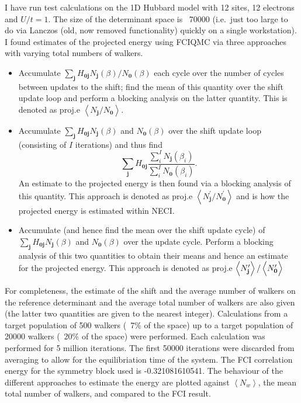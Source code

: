 \documentclass[a4paper, 12pt]{revtex4}
\newcommand{\bj}{\mathbf{j}}
\newcommand{\bz}{\mathbf{0}}
\newcommand{\av}[1]{\left\langle#1\right\rangle}
\begin{document}
I have run test calculations on the 1D Hubbard model with 12 sites, 12 electrons and $U/t=1$.  The size of the determinant space is ~70000 (i.e.\ just too large to do via Lanczos (old, now removed functionality) quickly on a single workstation).  I found estimates of the projected energy using FCIQMC via three approaches with varying total numbers of walkers.
\begin{itemize}
\item Accumulate $\sum_\bj H_{\bz\bj} N_\bj(\beta)/N_\bz(\beta)$ each cycle over the number of cycles between updates to the shift; find the mean of this quantity over the shift update loop and perform a blocking analysis on the latter quantity.  This is denoted as proj.e $\av{N_\bj/N_\bz}$.
\item Accumulate $\sum_\bj H_{\bz\bj} N_\bj(\beta)$ and $N_\bz(\beta)$ over the shift update loop (consisting of $I$ iterations) and thus find
    \begin{equation}
    \sum_\bj H_{\bz\bj} \frac{\sum_i^I N_\bj(\beta_i)}{\sum_i^I N_\bz(\beta_i)}.
    \end{equation}
An estimate to the projected energy is then found via a blocking analysis of this quantity.  This approach is denoted as proj.e $\av{N_\bj^\prime/N_\bz^\prime}$ and is how the projected energy is estimated within NECI.
\item Accumulate (and hence find the mean over the shift update cycle) of  $\sum_\bj H_{\bz\bj} N_\bj(\beta)$ and $N_\bz(\beta)$ over the update cycle.  Perform a blocking analysis of this two quantities to obtain their means and hence an estimate for the projected energy.  This approach is denoted as proj.e $\av{N_\bj^\prime}/\av{N_\bz^\prime\vphantom{N_\bj^\prime}}$
\end{itemize}
For completeness, the estimate of the shift and the average number of walkers on the reference determinant and the average total number of walkers are also given (the latter two quantities are given to the nearest integer).  Calculations from a target population of 500 walkers (~7\% of the space) up to a target population of 20000 walkers (~20\% of the space) were performed.  Each calculation was performed for 5 million iterations.  The first 50000 iterations were discarded from averaging to allow for the equilibriation time of the system.  The FCI correlation energy for the symmetry block used is -0.321081610541.  The behaviour of the different approaches to estimate the energy are plotted against $\av{N_w}$, the mean total number of walkers, and compared to the FCI result.
\end{document}

